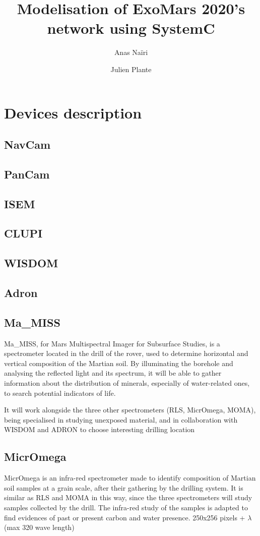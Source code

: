 \documentclass[12pt,a4paper]{article}
\author{Anas Naïri \and Julien Plante}
\title{Modelisation of ExoMars 2020's network using SystemC}
\begin{document}
\maketitle

\section{Devices description}
\subsection{NavCam}
\subsection{PanCam}
\subsection{ISEM}
\subsection{CLUPI}
\subsection{WISDOM}
\subsection{Adron}
\subsection{Ma\_MISS}
Ma\_MISS, for Mars Multispectral Imager for Subsurface Studies, is a spectrometer located in the drill of the rover, used to determine horizontal and vertical composition of the Martian soil. By illuminating the borehole and analysing the reflected light and its spectrum, it will be able to gather information about the distribution of minerals, especially of water-related ones, to search potential indicators of life.

It will work alongside the three other spectrometers (RLS, MicrOmega, MOMA), being specialised in studying unexposed material, and in collaboration with WISDOM and ADRON to choose interesting drilling location

\subsection{MicrOmega}

MicrOmega is an infra-red spectrometer made to identify composition of Martian soil samples at a grain scale, after their gathering by the drilling system. It is similar as RLS and MOMA in this way, since the three spectrometers will study samples collected by the drill. The infra-red study of the samples is adapted to find evidences of past or present carbon and water presence. 
250x256 pixels + $\lambda$ (max 320 wave length)
\end{document}
